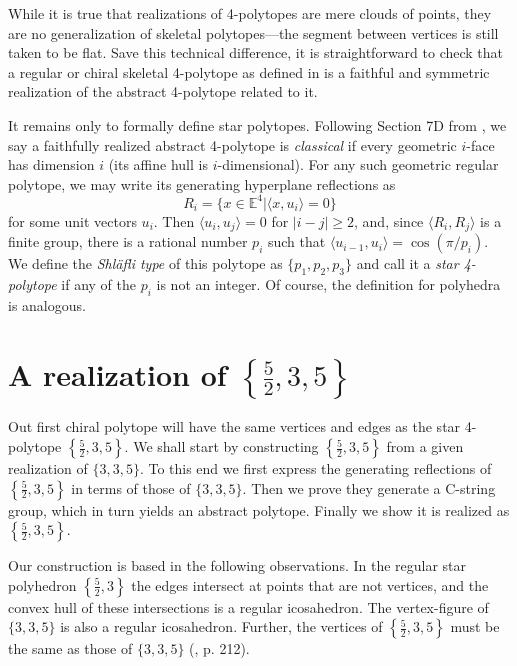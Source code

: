 \documentclass{article}
\theoremstyle{definition}
\newcommand{\E}{\mathbb{E}}
\begin{document}
	While it is true that realizations of 4-polytopes are mere clouds of points, they are no generalization of skeletal polytopes---the segment between vertices is still taken to be flat. Save this technical difference, it is straightforward to check that a regular or chiral skeletal 4-polytope as defined in  is a faithful and symmetric realization of the abstract 4-polytope related to it.
	
	\vspace{.5cm}
	
	It remains only to formally define star polytopes. Following Section 7D from \cite{abstract-polytopes}, we say a faithfully realized abstract 4-polytope is \textit{classical} if every geometric $i$-face has dimension $i$ (its affine hull is $i$-dimensional). For any such geometric regular polytope, we may write its generating hyperplane reflections as
	\[R_i=\{x\in\E^4|\langle x,u_i\rangle=0\}\]
	for some unit vectors $u_i$. Then $\langle u_i,u_j\rangle=0$ for $|i-j|\geq2$, and, since $\langle R_i,R_j\rangle$ is a finite group, there is a rational number $p_i$ such that $\langle u_{i-1},u_i\rangle=\cos(\pi/p_i)$. We define the \textit{Shläfli type} of this polytope as $\{p_1,p_2,p_3\}$ and call it a \textit{star 4-polytope} if any of the $p_i$ is not an integer. Of course, the definition for polyhedra is analogous.

	\section{A realization of $\left\{\frac{5}{2},3,5\right\}$}
	Out first chiral polytope will have the same vertices and edges as the star 4-polytope $\left\{\frac{5}{2},3,5\right\}$. We shall start by constructing $\left\{\frac{5}{2},3,5\right\}$ from a given realization of $\{3,3,5\}$. To this end we first express the generating reflections of $\left\{\frac{5}{2},3,5\right\}$ in terms of those of $\{3,3,5\}$. Then we prove they generate a C-string group, which in turn yields an abstract polytope. Finally we show it is realized as $\left\{\frac{5}{2},3,5\right\}$.
	
	Our construction is based in the following observations. In the regular star polyhedron $\left\{\frac{5}{2},3\right\}$ the edges intersect at points that are not vertices, and the convex hull of these intersections is a regular icosahedron. The vertex-figure of $\{3,3,5\}$ is also a regular icosahedron. Further, the vertices of $\left\{\frac{5}{2},3,5\right\}$ must be the same as those of $\{3,3,5\}$ (\cite{abstract-polytopes}, p. 212).
	
\end{document}
